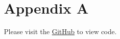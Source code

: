 \documentclass[11pt]{article}
\begin{document}
\newpage
\appendix

\section{Appendix A}
Please visit the \href{https://github.com/hrudhai98/vip-codebase}{GitHub} to view code. 




\nocite{*}

 
\end{document}
